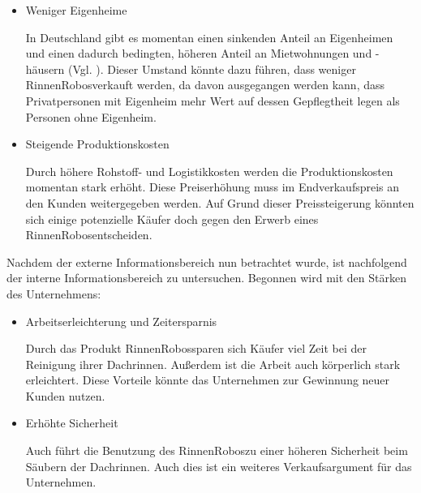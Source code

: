     \begin{itemize}
        \item Weniger Eigenheime

            In Deutschland gibt es momentan einen sinkenden Anteil an Eigenheimen und einen dadurch bedingten, höheren
            Anteil an Mietwohnungen und -häusern (Vgl. \cite{Mueller2021}). Dieser Umstand könnte dazu führen, dass weniger
            \as RinnenRobos\adl verkauft werden, da davon ausgegangen werden kann, dass Privatpersonen mit Eigenheim
            mehr Wert auf dessen Gepflegtheit legen als Personen ohne Eigenheim.

        \item Steigende Produktionskosten
        
            Durch höhere Rohstoff- und Logistikkosten werden die Produktionskosten momentan stark erhöht. Diese
            Preiserhöhung muss im Endverkaufspreis an den Kunden weitergegeben werden. Auf Grund dieser Preissteigerung
            könnten sich einige potenzielle Käufer doch gegen den Erwerb eines \as RinnenRobos\adl entscheiden.
    \end{itemize}

\noindent Nachdem der externe Informationsbereich nun betrachtet wurde, ist nachfolgend der interne Informationsbereich
zu untersuchen. Begonnen wird mit den Stärken des Unternehmens:

    \begin{itemize}
        \item Arbeitserleichterung und Zeitersparnis
        
            Durch das Produkt \as RinnenRobos\adl sparen sich Käufer viel Zeit bei der Reinigung ihrer Dachrinnen. Außerdem ist
            die Arbeit auch körperlich stark erleichtert. Diese Vorteile könnte das Unternehmen zur Gewinnung neuer
            Kunden nutzen.

        \item Erhöhte Sicherheit
        
            Auch führt die Benutzung des \as RinnenRobos\adl zu einer höheren Sicherheit beim Säubern der Dachrinnen. Auch
            dies ist ein weiteres Verkaufsargument für das Unternehmen.
    \end{itemize}